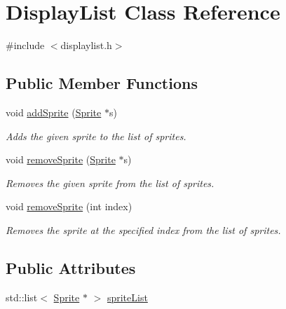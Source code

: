 \hypertarget{class_display_list}{\section{Display\-List Class Reference}
\label{class_display_list}
}


{\ttfamily \#include $<$displaylist.\-h$>$}

\subsection*{Public Member Functions}
\begin{DoxyCompactItemize}
\item 
void \hyperlink{class_display_list_ae80fef809c309ea0312ff8550f1d74b0}{add\-Sprite} (\hyperlink{class_sprite}{Sprite} $\ast$s)
\begin{DoxyCompactList}\small\item\em Adds the given sprite to the list of sprites. \end{DoxyCompactList}\item 
void \hyperlink{class_display_list_a528dc0aa9eae97d42c2730062b3ebd68}{remove\-Sprite} (\hyperlink{class_sprite}{Sprite} $\ast$s)
\begin{DoxyCompactList}\small\item\em Removes the given sprite from the list of sprites. \end{DoxyCompactList}\item 
void \hyperlink{class_display_list_a13bf50321873a728c91937c65d6f4064}{remove\-Sprite} (int index)
\begin{DoxyCompactList}\small\item\em Removes the sprite at the specified index from the list of sprites. \end{DoxyCompactList}\end{DoxyCompactItemize}
\subsection*{Public Attributes}
\begin{DoxyCompactItemize}
\item 
std\-::list$<$ \hyperlink{class_sprite}{Sprite} $\ast$ $>$ \hyperlink{class_display_list_acc1fb4e8ee4685b37c6497d2331ff24e}{sprite\-List}
\end{DoxyCompactItemize}


